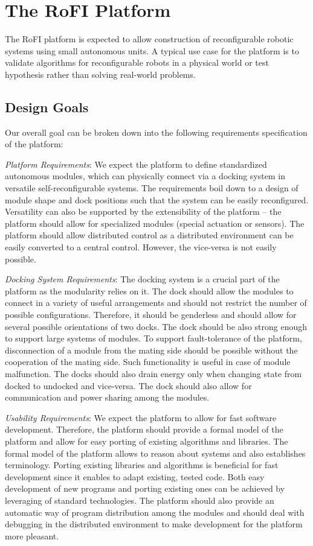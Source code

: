 \chapter{The RoFI Platform}\label{chap:rofi}

The RoFI platform is expected to allow construction of reconfigurable robotic
systems using small autonomous units. A typical use case for the platform is to
validate algorithms for reconfigurable robots in a physical world or test
hypothesis rather than solving real-world problems.

\section{Design Goals}\label{sec:design_goals}

Our overall goal can be broken down into the following requirements
specification of the platform:

\emph{Platform Requirements}: We expect the platform to define standardized
autonomous modules, which can physically connect via a docking system in
versatile self-reconfigurable systems. The requirements boil down to a design of
module shape and dock positions such that the system can be easily reconfigured.
Versatility can also be supported by the extensibility of the platform -- the
platform should allow for specialized modules (special actuation or sensors).
The platform should allow distributed control as a distributed environment can
be easily converted to a central control. However, the vice-versa is not easily
possible.

\emph{Docking System Requirements}: The docking system is a crucial part of the
platform as the modularity relies on it. The dock should allow the modules to
connect in a variety of useful arrangements and should not restrict the number
of possible configurations. Therefore, it should be genderless and should allow
for several possible orientations of two docks. The dock should be also strong
enough to support large systems of modules. To support fault-tolerance of the
platform, disconnection of a module from the mating side should be possible
without the cooperation of the mating side. Such functionality is useful in case
of module malfunction. The docks should also drain energy only when changing
state from docked to undocked and vice-versa. The dock should also allow for
communication and power sharing among the modules.

\emph{Usability Requirements}: We expect the platform to allow for fast software
development. Therefore, the platform should provide a formal model of the
platform and allow for easy porting of existing algorithms and libraries. The
formal model of the platform allows to reason about systems and also establishes
terminology. Porting existing libraries and algorithms is beneficial for fast
development since it enables to adapt existing, tested code. Both easy
development of new programs and porting existing ones can be achieved by
leveraging of standard technologies. The platform should also provide an
automatic way of program distribution among the modules and should deal with
debugging in the distributed environment to make development for the platform
more pleasant.

